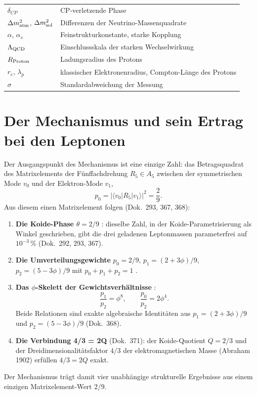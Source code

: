 \begin{tabular}{@{}lp{9cm}@{}}
$\delta_{CP}$ & CP-verletzende Phase \\
$\Delta m^2_{\rm atm}$, $\Delta m^2_{\rm sol}$ & Differenzen der Neutrino-Massenquadrate \\
$\alpha$, $\alpha_s$ & Feinstrukturkonstante, starke Kopplung \\
$\Lambda_{\rm QCD}$ & Einschlussskala der starken Wechselwirkung \\
$R_{\rm Proton}$ & Ladungsradius des Protons \\
$r_e$, $\lambda_p$ & klassischer Elektronenradius, Compton-Länge des Protons \\
$\sigma$ & Standardabweichung der Messung \\
\bottomrule
\end{tabular}

\section{Der Mechanismus und sein Ertrag bei den Leptonen}
\label{sec:ertrag}

Der Ausgangspunkt des Mechanismus ist eine einzige Zahl: das Betragsquadrat
des Matrixelements der Fünffachdrehung $R_5 \in A_5$ zwischen der
symmetrischen Mode $v_0$ und der Elektron-Mode $v_1$,
\[
  p_0 = |\langle v_0|R_5|v_1\rangle|^2 = \frac{2}{9}.
\]
Aus diesem einen Matrixelement folgen (Dok.~293, 367, 368):

\begin{enumerate}
\item \textbf{Die Koide-Phase $\theta = 2/9$} \BM: dieselbe Zahl, in der
  Koide-Parametrisierung als Winkel geschrieben, gibt die drei geladenen
  Leptonmassen parameterfrei auf $10^{-3}$\,\% (Dok.~292, 293, 367).
\item \textbf{Die Umverteilungsgewichte} $p_0 = 2/9$, $p_1 = (2+3\phi)/9$,
  $p_2 = (5-3\phi)/9$ mit $p_0+p_1+p_2 = 1$ \BM.
\item \textbf{Das $\phi$-Skelett der Gewichtsverhältnisse} \BM:
  \[
    \frac{p_1}{p_2} = \phi^8, \qquad \frac{p_0}{p_2} = 2\phi^4.
  \]
  Beide Relationen sind exakte algebraische Identitäten aus
  $p_1=(2+3\phi)/9$ und $p_2=(5-3\phi)/9$ (Dok.~368).
\item \textbf{Die Verbindung 4/3 = 2Q} (Dok.~371): der Koide-Quotient
  $Q = 2/3$ und der Dreidimensionalitätsfaktor $4/3$ der elektromagnetischen
  Masse (Abraham 1902) erfüllen $4/3 = 2Q$ exakt.
\end{enumerate}

Der Mechanismus trägt damit vier unabhängige strukturelle Ergebnisse aus
einem einzigen Matrixelement-Wert $2/9$.

